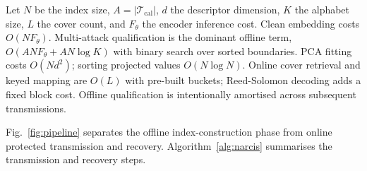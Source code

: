 \documentclass[10pt,journal]{IEEEtran}
\begin{document}
Let $N$ be the index size, $A{=}|\mathcal{T}_{\mathrm{cal}}|$, $d$
the descriptor dimension, $K$ the alphabet size, $L$ the cover count,
and $F_\theta$ the encoder inference cost. Clean embedding costs
$O(NF_\theta)$. Multi-attack qualification is the dominant offline
term, $O(ANF_\theta{+}AN\log K)$ with binary search over sorted
boundaries. PCA fitting costs $O(Nd^2)$; sorting projected values
$O(N\log N)$. Online cover retrieval and keyed mapping are $O(L)$
with pre-built buckets; Reed-Solomon decoding adds a fixed block cost.
Offline qualification is intentionally amortised across subsequent
transmissions.

Fig.~\ref{fig:pipeline} separates the offline index-construction phase
from online protected transmission and recovery. Algorithm~\ref{alg:narcis}
summarises the transmission and recovery steps.
\end{document}
